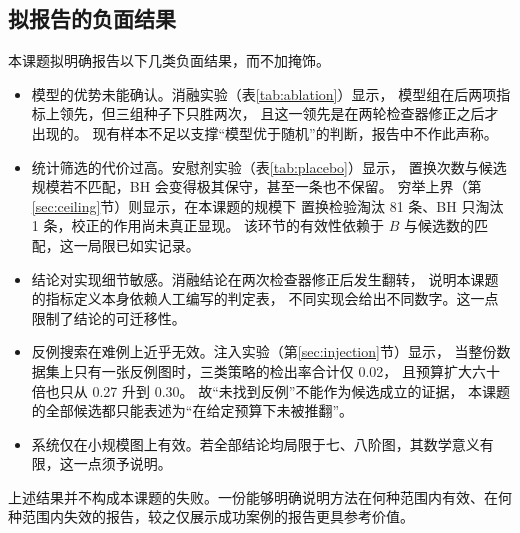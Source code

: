 \subsection{拟报告的负面结果}

本课题拟明确报告以下几类负面结果，而不加掩饰。

\begin{itemize}
  \item 模型的优势未能确认。消融实验（表\ref{tab:ablation}）显示，
  模型组在后两项指标上领先，但三组种子下只胜两次，
  且这一领先是在两轮检查器修正之后才出现的。
  现有样本不足以支撑“模型优于随机”的判断，报告中不作此声称。
  \item 统计筛选的代价过高。安慰剂实验（表\ref{tab:placebo}）显示，
  置换次数与候选规模若不匹配，BH 会变得极其保守，甚至一条也不保留。
  穷举上界（第\ref{sec:ceiling}节）则显示，在本课题的规模下
  置换检验淘汰 81 条、BH 只淘汰 1 条，校正的作用尚未真正显现。
  该环节的有效性依赖于 $B$ 与候选数的匹配，这一局限已如实记录。
  \item 结论对实现细节敏感。消融结论在两次检查器修正后发生翻转，
  说明本课题的指标定义本身依赖人工编写的判定表，
  不同实现会给出不同数字。这一点限制了结论的可迁移性。
  \item 反例搜索在难例上近乎无效。注入实验（第\ref{sec:injection}节）显示，
  当整份数据集上只有一张反例图时，三类策略的检出率合计仅 0.02，
  且预算扩大六十倍也只从 0.27 升到 0.30。
  故“未找到反例”不能作为候选成立的证据，
  本课题的全部候选都只能表述为“在给定预算下未被推翻”。
  \item 系统仅在小规模图上有效。若全部结论均局限于七、八阶图，其数学意义有限，这一点须予说明。
\end{itemize}

上述结果并不构成本课题的失败。一份能够明确说明方法在何种范围内有效、在何种范围内失效的报告，较之仅展示成功案例的报告更具参考价值。
